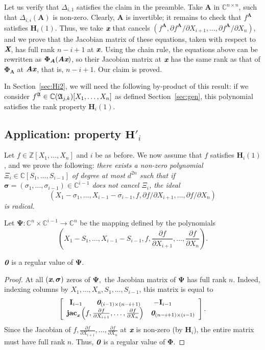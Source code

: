 \documentclass[sigconf]{acmart}
\def\bz{\textit{\textbf{0}}}
\def\Xb{\textit{\textbf{X}}}
\def\mA{{\bm A}}
\def\xb{\textit{\textbf{x}}}
\def\C{\mathbb{C}}
\def\jac{ \textbf{jac}}
\def\bI{\textbf{I}}
\def\pa{\partial}
\newcommand{\ZZ}{{\mathbb{Z}}}
\def\A{\frak{A}}
\begin{document}
Let us verify that $\Delta_{i,1}$ satisfies the claim in the preamble.
Take $\mA$ in $\C^{n\times n}$, such that $\Delta_{i,i}(\mA)$ is
non-zero. Clearly, $\mA$ is invertible; it remains to check that
$f^\mA$ satisfies $\textbf{H}_i(1)$. Thus, we take $\xb$ that cancels
$(f^\mA, {\pa f^\mA}/{\pa X_{i+1}},\dots,{\pa f^\mA}/{\pa X_n})$, and
we prove that the Jacobian matrix of these equations, taken with
respect to $\Xb$, has full rank $n-i+1$ at $\xb$. Using the chain
rule, the equations above can be rewritten as $\bm\Phi_\mA(\mA \xb)$,
so their Jacobian matrix at $\xb$ has the same rank as that of
$\bm\Phi_\mA$ at $\mA \xb$, that is, $n-i+1$. Our claim is proved.

In Section~\ref{sec:Hi2}, we will need the following by-product of
this result: if we consider $f^\A \in \C(\frak
A_{j,k})[X_1,\dots,X_n]$ as defined Section~\ref{sec:gen}, this
polynomial satisfies the rank property $\textbf{H}_i(1)$.


\subsection{Application: property $\textbf{H}'_i$}\label{ssec:fiber}

Let $f \in \ZZ[X_1,\hdots,X_n]$ and $i$ be as before. We now assume
that $f$ satisfies $\textbf{H}_i(1)$, and we prove the following: {\em
  there exists a non-zero polynomial $\Xi_{i} \in
  \C[S_1,\dots,S_{i-1}]$ of degree at most $d^{2n}$ such that if $\bm
  \sigma =(\sigma_1,\dots,\sigma_{i-1})\in \C^{i-1}$ does not cancel
  $\Xi_{i}$, the ideal
  $$(X_1-\sigma_1,\dots,X_{i-1}-\sigma_{i-1},f, {\pa f}/{\pa
    X_{i+1}},\dots,{\pa f}/{\pa X_n})$$ is radical.}

\smallskip

Let $\bm\Psi: \C^n \times \C^{i-1} \rightarrow \C^{n}$ be the mapping defined by the polynomials
\[
  (X_1-S_1,\hdots,X_{i-1}-S_{i-1}, f,\frac{\pa f}{\pa X_{i+1}},\hdots,\frac{\pa f}{\pa X_n} ).
\]
%
\begin{lemma}
  $\bz$ is a regular value of $\bm\Psi.$
\end{lemma}
\begin{proof}
At all $(\xb,\bm\sigma)$ zeros of $\bm\Psi,$ the Jacobian matrix of
$\bm\Psi$ has full rank $n$. Indeed, indexing columns 
by $X_1,\dots,X_n,S_1,\dots,S_{i-1}$, this matrix is equal to
\[
\left[ 
\begin{array}{cc}
\bI_{i-1}\hspace{7mm} \bz_{(i-1)\times (n-i+1)}&\hspace{-10mm}-\bI_{i-1}\\
\jac_{\xb}\left(f,\frac{\pa
  f}{\pa X_{i+1}},\hdots,\frac{\pa f}{\pa X_n}\right)&\bz_{(n-i+1)\times (i-1)}
\end{array}
\right].
\] 
Since the Jacobian of $f,\frac{\pa f}{\pa X_{i+1}},\hdots,\frac{\pa
  f}{\pa X_n}$ at $\xb$ is non-zero (by $\textbf{H}_i$), the entire
matrix must have full rank $n$. Thus,  $\bz$ is a regular value of $\bm\Phi.$
\end{proof}
\end{document}
